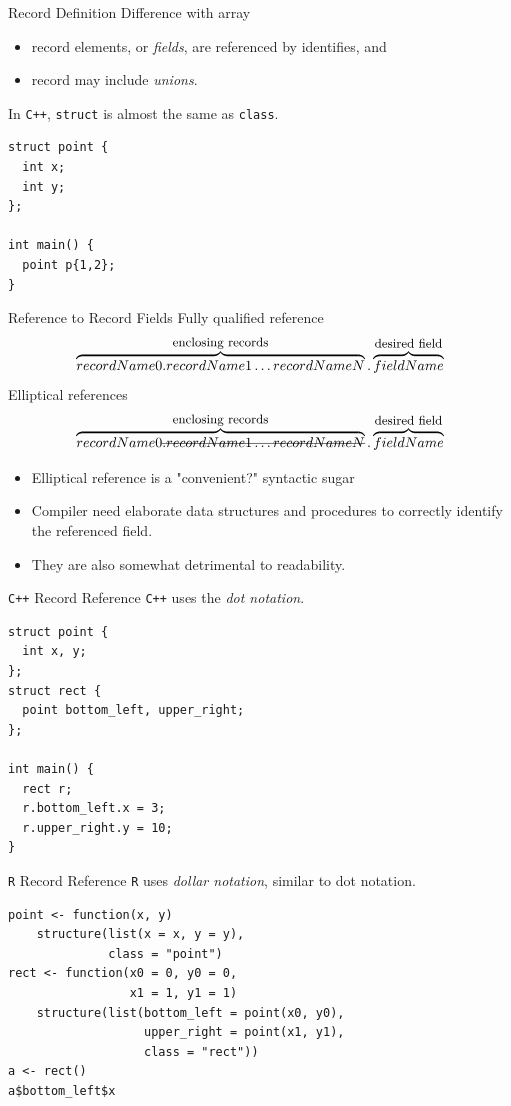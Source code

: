 \documentclass[presentation]{beamer}
\begin{document}
\begin{frame}[fragile,label={sec:orgheadline39}]{Record Definition}
 Difference with array
\begin{itemize}
\item record elements, or \emph{fields}, are referenced by identifies, and
\item record may include \emph{unions}.
\end{itemize}

In \texttt{C++}, \texttt{struct} is almost the same as \texttt{class}.

\begin{verbatim}
struct point {
  int x;
  int y;
};

int main() {
  point p{1,2};
}
\end{verbatim}
\end{frame}

\begin{frame}[label={sec:orgheadline40}]{Reference to Record Fields}
Fully qualified reference
\[\overbrace{recordName0.recordName1\dots recordNameN}^{\text{\small enclosing records}}.\overbrace{fieldName}^{\text{\small desired field}}\]
Elliptical references
\[\overbrace{recordName0\text{\sout{\(.recordName1\dots recordNameN\)}}}^{\text{\small enclosing records}}.\overbrace{fieldName}^{\text{\small desired field}}\]


\begin{itemize}
\item Elliptical reference is a "convenient?" syntactic sugar
\item Compiler need elaborate data structures and procedures to
correctly identify the referenced field.
\item They are also somewhat detrimental to readability.
\end{itemize}
\end{frame}


\begin{frame}[fragile,label={sec:orgheadline41}]{\texttt{C++} Record Reference}
 \texttt{C++} uses the \emph{dot notation}.

\begin{verbatim}
struct point {
  int x, y;
};
struct rect {
  point bottom_left, upper_right;
};

int main() {
  rect r;
  r.bottom_left.x = 3;
  r.upper_right.y = 10;
}
\end{verbatim}
\end{frame}

\begin{frame}[fragile,label={sec:orgheadline42}]{\texttt{R} Record Reference}
 \texttt{R} uses \emph{dollar notation}, similar to dot notation.

\begin{verbatim}
point <- function(x, y)
    structure(list(x = x, y = y),
              class = "point")
rect <- function(x0 = 0, y0 = 0,
                 x1 = 1, y1 = 1)
    structure(list(bottom_left = point(x0, y0),
                   upper_right = point(x1, y1),
                   class = "rect"))
a <- rect()
a$bottom_left$x
\end{verbatim}
\end{frame}
\end{document}
